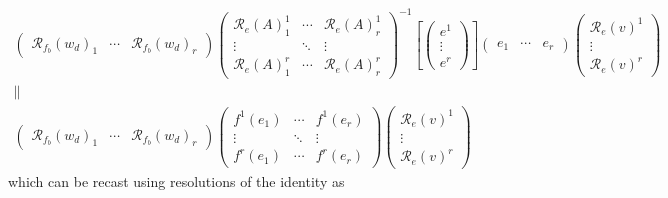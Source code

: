 \documentclass[aps,preprint]{revtex4}
\begin{document}
\begin{gather}
\left( 
\begin{array}{ccc}
\mathcal{R}_{f_{b}}\left( w_{d}\right) _{1} & \cdots & \mathcal{R}%
_{f_{b}}\left( w_{d}\right) _{r}%
\end{array}%
\right) \left( 
\begin{array}{ccc}
\mathcal{R}_{e}\left( A\right) _{1}^{1} & \cdots & \mathcal{R}_{e}\left(
A\right) _{r}^{1} \\ 
\vdots & \ddots & \vdots \\ 
\mathcal{R}_{e}\left( A\right) _{1}^{r} & \cdots & \mathcal{R}_{e}\left(
A\right) _{r}^{r}%
\end{array}%
\right) ^{-1}\left[ \left( 
\begin{array}{c}
e^{1} \\ 
\vdots \\ 
e^{r}%
\end{array}%
\right) \right] \left( 
\begin{array}{ccc}
e_{1} & \cdots & e_{r}%
\end{array}%
\right) \left( 
\begin{array}{c}
\mathcal{R}_{e}\left( v\right) ^{1} \\ 
\vdots \\ 
\mathcal{R}_{e}\left( v\right) ^{r}%
\end{array}%
\right) \\
\parallel \\
\left( 
\begin{array}{ccc}
\mathcal{R}_{f_{b}}\left( w_{d}\right) _{1} & \cdots & \mathcal{R}%
_{f_{b}}\left( w_{d}\right) _{r}%
\end{array}%
\right) \left( 
\begin{array}{ccc}
f^{1}\left( e_{1}\right) & \cdots & f^{1}\left( e_{r}\right) \\ 
\vdots & \ddots & \vdots \\ 
f^{r}\left( e_{1}\right) & \cdots & f^{r}\left( e_{r}\right)%
\end{array}%
\right) \left( 
\begin{array}{c}
\mathcal{R}_{e}\left( v\right) ^{1} \\ 
\vdots \\ 
\mathcal{R}_{e}\left( v\right) ^{r}%
\end{array}%
\right)
\end{gather}%
which can be recast using resolutions of the identity as 
\end{document}
